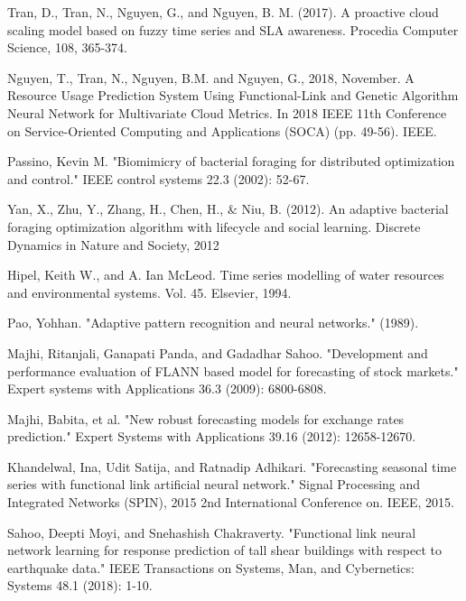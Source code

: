 \documentclass[runningheads]{llncs}
\begin{document}
\begin{thebibliography}{8}
Tran, D., Tran, N., Nguyen, G., and Nguyen, B. M. (2017). A proactive cloud scaling model based on fuzzy time series and SLA awareness. Procedia Computer Science, 108, 365-374.


Nguyen, T., Tran, N., Nguyen, B.M. and Nguyen, G., 2018, November. A Resource Usage Prediction System Using Functional-Link and Genetic Algorithm Neural Network for Multivariate Cloud Metrics. In 2018 IEEE 11th Conference on Service-Oriented Computing and Applications (SOCA) (pp. 49-56). IEEE.

Passino, Kevin M. "Biomimicry of bacterial foraging for distributed optimization and control." IEEE control systems 22.3 (2002): 52-67.

Yan, X., Zhu, Y., Zhang, H., Chen, H., $\&$ Niu, B. (2012). An adaptive bacterial foraging optimization algorithm with lifecycle and social learning. Discrete Dynamics in Nature and Society, 2012

Hipel, Keith W., and A. Ian McLeod. Time series modelling of water resources and environmental systems. Vol. 45. Elsevier, 1994.

Pao, Yohhan. "Adaptive pattern recognition and neural networks." (1989).

Majhi, Ritanjali, Ganapati Panda, and Gadadhar Sahoo. "Development and performance evaluation of FLANN based model for forecasting of stock markets." Expert systems with Applications 36.3 (2009): 6800-6808.

Majhi, Babita, et al. "New robust forecasting models for exchange rates prediction." Expert Systems with Applications 39.16 (2012): 12658-12670.

Khandelwal, Ina, Udit Satija, and Ratnadip Adhikari. "Forecasting seasonal time series with functional link artificial neural network." Signal Processing and Integrated Networks (SPIN), 2015 2nd International Conference on. IEEE, 2015.

Sahoo, Deepti Moyi, and Snehashish Chakraverty. "Functional link neural network learning for response prediction of tall shear buildings with respect to earthquake data." IEEE Transactions on Systems, Man, and Cybernetics: Systems 48.1 (2018): 1-10.
%


\end{thebibliography}
\end{document}
